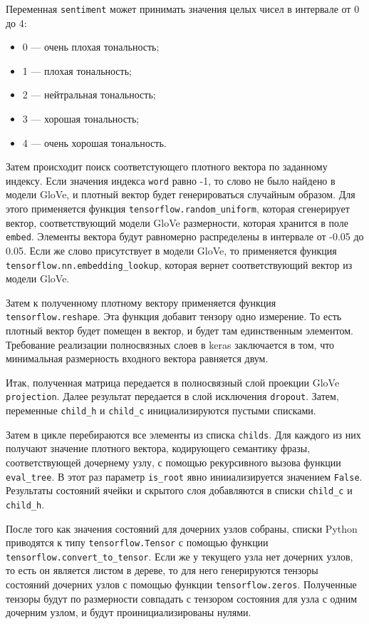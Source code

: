 Переменная \texttt{sentiment} может принимать значения целых чисел в интервале от 0 до 4:
\begin{itemize}
\item 0 --- очень плохая тональность;
\item 1 --- плохая тональность;
\item 2 --- нейтральная тональность;
\item 3 --- хорошая тональность;
\item 4 --- очень хорошая тональность.
\end{itemize}

Затем происходит поиск соответстующего плотного вектора по заданному индексу. Если значения индекса \texttt{word} равно -1, то слово не было найдено в модели GloVe, и плотный вектор будет генерироваться случайным образом. Для этого применяется функция \texttt{tensorflow.random\_uniform}, которая сгенерирует вектор, соответствующий модели GloVe размерности, которая хранится в поле \texttt{embed}. Элементы вектора будут равномерно распределены в интервале от -0.05 до 0.05. Если же слово присутствует в модели GloVe, то применяется функция \texttt{tensorflow.nn.embedding\_lookup}, которая вернет соответствующий вектор из модели GloVe.

Затем к полученному плотному вектору применяется функция \texttt{tensor\-flow.reshape}. Эта функция добавит тензору одно измерение. То есть плотный вектор будет помещен в вектор, и будет там единственным элементом. Требование реализации полносвязных слоев в keras заключается в том, что минимальная размерность входного вектора равняется двум.

Итак, полученная матрица передается в полносвязный слой проекции GloVe \texttt{projection}. Далее результат передается в слой исключения \texttt{dropo\-ut}. Затем, переменные \texttt{child\_h} и \texttt{child\_c} инициализируются пустыми списками.

Затем в цикле перебираются все элементы из списка \texttt{childs}. Для каждого из них получают значение плотного вектора, кодирующего семантику фразы, соответствующей дочернему узлу, с помощью рекурсивного вызова функции \texttt{eval\_tree}. В этот раз параметр \texttt{is\_root} явно инииализируется значением \texttt{False}. Результаты состояний ячейки и скрытого слоя добавляются в списки \texttt{child\_c} и \texttt{child\_h}.

После того как значения состояний для дочерних узлов собраны, списки Python приводятся к типу \texttt{tensorflow.Tensor} с помощью функции \texttt{ten\-sorflow.convert\_to\_tensor}. Если же у текущего узла нет дочерних узлов, то есть он является листом в дереве, то для него генерируются тензоры состояний дочерних узлов с помощью функции \texttt{tensorflow.zeros}. Полученные тензоры будут по размерности совпадать с тензором состояния для узла с одним дочерним узлом, и будут проинициализированы нулями.

